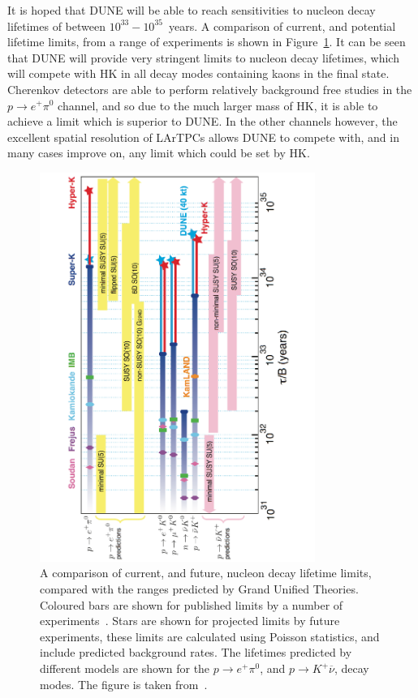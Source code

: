 It is hoped that DUNE will be able to reach sensitivities to nucleon decay lifetimes of between $10^{33}-10^{35}$~years. A comparison of current, and potential lifetime limits, from a range of experiments is shown in Figure~\ref{fig:DUNE_NDK_Lifetime}. It can be seen that DUNE will provide very stringent limits to nucleon decay lifetimes, which will compete with HK in all decay modes containing kaons in the final state. Cherenkov detectors are able to perform relatively background free studies in the $p \rightarrow e^{+} \pi^{0}$ channel, and so due to the much larger mass of HK, it is able to achieve a limit which is superior to DUNE. In the other channels however, the excellent spatial resolution of LArTPCs allows DUNE to compete with, and in many cases improve on, any limit which could be set by HK. \\

\begin{figure}
  \centering
  \includegraphics[width=0.8\textwidth]{NucleonDecayLimits}
  \caption[A comparison of current, and future, nucleon decay lifetime limits, compared with the ranges predicted by Grand Unified Theories.]
          {A comparison of current, and future, nucleon decay lifetime limits, compared with the ranges predicted by Grand Unified Theories. Coloured bars are shown for published limits by a number of experiments~\citep{PDG2012, Nishino:2012bnw}. Stars are shown for projected limits by future experiments, these limits are calculated using Poisson statistics, and include predicted background rates. The lifetimes predicted by different models are shown for the $p \rightarrow e^{+} \pi^{0}$, and $p \rightarrow K^{+} \overline{\nu}$, decay modes. The figure is taken from~\citep{DUNECDR_V2}.}
  \label{fig:DUNE_NDK_Lifetime}
\end{figure}

